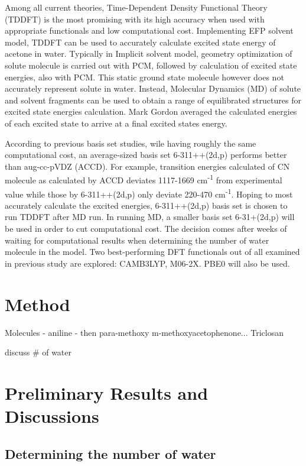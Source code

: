 \documentclass[
journal=jacsat, %
manuscript=article]{achemso}
\begin{document}
Among all current theories, Time-Dependent Density Functional Theory (TDDFT) is the most promising with its high accuracy when used with appropriate functionals and low computational cost\cite{Magyar2007}. Implementing EFP solvent model, TDDFT can be used to accurately calculate excited state energy of acetone in water.\cite{Yoo2008} Typically in Implicit solvent model, geometry optimization of solute molecule is carried out with PCM, followed by calculation of excited state energies, also with PCM. This static ground state molecule however does not accurately represent solute in water.\cite{Defusco2011} Instead, Molecular Dynamics (MD) of solute and solvent fragments can be used to obtain a range of equilibrated structures for excited state energies calculation. Mark Gordon averaged the calculated energies of each excited state to arrive at a final excited states energy.\cite{Defusco2011} 

According to previous basis set studies, wile having roughly the same computational cost, an average-sized basis set 6-311++(2d,p) performs better than aug-cc-pVDZ (ACCD).\cite{Wiberg2004,Barnes2014} For example, transition energies calculated of CN molecule as calculated by ACCD deviates 1117-1669 cm\textsuperscript{-1} from experimental value while those by 6-311++(2d,p) only deviate 220-470 cm\textsuperscript{-1}. Hoping to most accurately calculate the excited energies, 6-311++(2d,p) basis set is chosen to run TDDFT after MD run. In running MD, a smaller basis set 6-31+(2d,p) will be used in order to cut computational cost. The decision comes after weeks of waiting for computational results when determining the number of water molecule in the model. Two best-performing DFT functionals out of all examined in previous study are explored: CAMB3LYP, M06-2X.\cite{Barnes2014} PBE0 will also be used.

\section{Method}

Molecules - aniline - then para-methoxy m-methoxyacetophenone... Triclosan

discuss \# of water



\section{Preliminary Results and Discussions}

\subsection{Determining the number of water}
\end{document}
